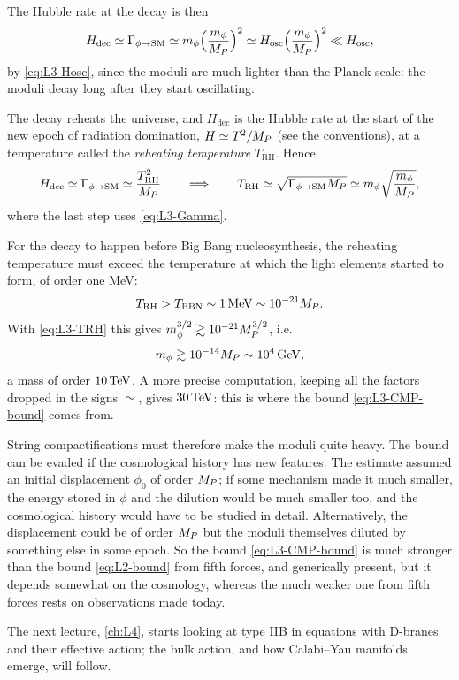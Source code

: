 The Hubble rate at the decay is then
\begin{equation}
  H_{\text{dec}}\simeq\Gamma_{\phi\to\text{SM}}\simeq m_\phi\Bigl(\frac{m_\phi}{M_{P}}\Bigr)^2
  \simeq H_{\text{osc}}\Bigl(\frac{m_\phi}{M_{P}}\Bigr)^2\ll H_{\text{osc}} ,
  \label{eq:L3-Hdec}
\end{equation}
by \cref{eq:L3-Hosc}, since the moduli are much lighter than the Planck scale: the moduli decay long after they start oscillating.

The decay reheats the universe, and $H_{\text{dec}}$ is the Hubble rate at the start of the new epoch of radiation domination, $H\simeq T^2/M_{P}$ (see the conventions), at a temperature called the \emph{reheating temperature} $T_{\text{RH}}$. Hence
\begin{equation}
  H_{\text{dec}}\simeq\Gamma_{\phi\to\text{SM}}\simeq\frac{T_{\text{RH}}^2}{M_{P}}
  \qquad\Longrightarrow\qquad
  T_{\text{RH}}\simeq\sqrt{\Gamma_{\phi\to\text{SM}}M_{P}}\simeq m_\phi\sqrt{\frac{m_\phi}{M_{P}}} ,
  \label{eq:L3-TRH}
\end{equation}
where the last step uses \cref{eq:L3-Gamma}.

For the decay to happen before Big Bang nucleosynthesis, the reheating temperature must exceed the temperature at which the light elements started to form, of order one MeV:
\begin{equation}
  T_{\text{RH}} > T_{\text{BBN}}\sim1\,\mathrm{MeV}\sim10^{-21}M_{P} .
  \label{eq:L3-TBBN}
\end{equation}
With \cref{eq:L3-TRH} this gives $m_\phi^{3/2}\gtrsim10^{-21}M_{P}^{3/2}$, i.e.
\begin{equation}
  m_\phi\gtrsim10^{-14}M_{P}\sim10^4\,\mathrm{GeV} ,
  \label{eq:L3-mass-bound}
\end{equation}
a mass of order $10\,\mathrm{TeV}$. A more precise computation, keeping all the factors dropped in the signs $\simeq$, gives $30\,\mathrm{TeV}$: this is where the bound \cref{eq:L3-CMP-bound} comes from.

String compactifications must therefore make the moduli quite heavy. The bound can be evaded if the cosmological history has new features. The estimate assumed an initial displacement $\phi_0$ of order $M_{P}$; if some mechanism made it much smaller, the energy stored in $\phi$ and the dilution would be much smaller too, and the cosmological history would have to be studied in detail. Alternatively, the displacement could be of order $M_{P}$ but the moduli themselves diluted by something else in some epoch. So the bound \cref{eq:L3-CMP-bound} is much stronger than the bound \cref{eq:L2-bound} from fifth forces, and generically present, but it depends somewhat on the cosmology, whereas the much weaker one from fifth forces rests on observations made today.

The next lecture, \cref{ch:L4}, starts looking at type IIB in equations with D-branes and their effective action; the bulk action, and how Calabi--Yau manifolds emerge, will follow.
